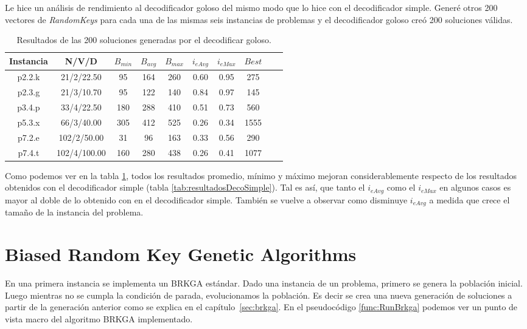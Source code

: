 \bigskip

Le hice un análisis de rendimiento al decodificador goloso del mismo modo que lo hice con el decodificador simple. Generé otros 200 vectores de \textit{RandomKeys} para cada una de las mismas seis instancias de problemas y el decodificador goloso creó 200 soluciones válidas.

\begin{table}
\begin{center}
\begin{tabular}{ |c|c|c|c|c|c|c|c|c|c| } 
\hline
Instancia & N/V/D & $B_{min}$ & $B_{avg}$ & $B_{max}$ & $i_{eAvg}$ & $i_{eMax}$ & $Best$ \\
\hline
p2.2.k & 21/2/22.50 & 95 & 164 & 260 & 0.60 & 0.95 & 275 \\
p2.3.g & 21/3/10.70 & 95 & 122 & 140 & 0.84 & 0.97 & 145 \\
p3.4.p & 33/4/22.50 & 180 & 288 & 410 & 0.51 & 0.73 & 560 \\
p5.3.x & 66/3/40.00 & 305 & 412 & 525 & 0.26 & 0.34 & 1555 \\
p7.2.e & 102/2/50.00 & 31 & 96 & 163 & 0.33 & 0.56 & 290 \\
p7.4.t & 102/4/100.00 & 160 & 280 & 438 & 0.26 & 0.41 & 1077 \\
\hline
\end{tabular}
\end{center}
\caption{Resultados de las 200 soluciones generadas por el decodificar goloso.}
\label{tab:resultadosDecoGoloso}
\end{table}

\bigskip

Como podemos ver en la tabla \ref{tab:resultadosDecoGoloso}, todos los resultados promedio, mínimo y máximo mejoran considerablemente respecto de los resultados obtenidos con el decodificador simple (tabla \ref{tab:resultadosDecoSimple}). Tal es así, que tanto el $i_{eAvg}$ como el $i_{eMax}$ en algunos casos es mayor al doble de lo obtenido con en el decodificador simple. También se vuelve a observar como disminuye $i_{eAvg}$ a medida que crece el tamaño de la instancia del problema.

\section{Biased Random Key Genetic Algorithms}

En una primera instancia se implementa un BRKGA estándar. Dado una instancia de un problema, primero se genera la población inicial. Luego mientras no se cumpla la condición de parada, evolucionamos la población. Es decir se crea una nueva generación de soluciones a partir de la generación anterior como se explica en el capítulo~\ref{sec:brkga}. En el pseudocódigo \ref{func:RunBrkga} podemos ver un punto de vista macro del algoritmo BRKGA implementado.

